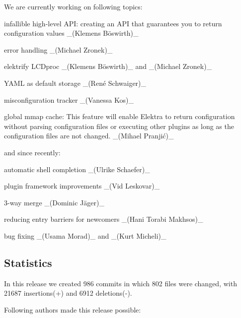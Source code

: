 We are currently working on following topics\+:


\begin{DoxyItemize}
\item infallible high-\/level A\+PI\+: creating an A\+PI that guarantees you to return configuration values \+\_\+(Klemens Böswirth)\+\_\+
\item error handling \+\_\+(\+Michael Zronek)\+\_\+
\item elektrify L\+C\+Dproc \+\_\+(Klemens Böswirth)\+\_\+ and \+\_\+(\+Michael Zronek)\+\_\+
\item Y\+A\+ML as default storage \+\_\+(René Schwaiger)\+\_\+
\item misconfiguration tracker \+\_\+(\+Vanessa Kos)\+\_\+
\item global mmap cache\+: This feature will enable Elektra to return configuration without parsing configuration files or executing other plugins as long as the configuration files are not changed. \+\_\+(Mihael Pranjić)\+\_\+
\end{DoxyItemize}

and since recently\+:


\begin{DoxyItemize}
\item automatic shell completion \+\_\+(\+Ulrike Schaefer)\+\_\+
\item plugin framework improvements \+\_\+(\+Vid Leskovar)\+\_\+
\item 3-\/way merge \+\_\+(Dominic Jäger)\+\_\+
\item reducing entry barriers for newcomers \+\_\+(\+Hani Torabi Makhsos)\+\_\+
\item bug fixing \+\_\+(\+Usama Morad)\+\_\+ and \+\_\+(\+Kurt Micheli)\+\_\+
\end{DoxyItemize}

\subsection*{Statistics}

In this release we created 986 commits in which 802 files were changed, with 21687 insertions(+) and 6912 deletions(-\/).

Following authors made this release possible\+:

